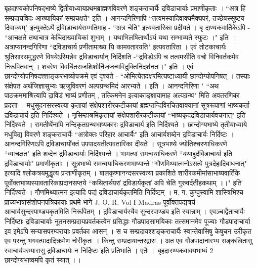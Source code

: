 बृहदाण्यकोपनिषद्भाष्ये द्वितीयाध्यायप्रथमब्राह्मणविवरणे शङ्कराचार्यैः द्रविडाचार्याः प्रमाणीकृताः । ``अत्र हि सम्प्रदायविदः आख्यायिकां सम्प्रचक्षते" इति । आनन्दगिरिणापि ``तत्वमस्यादिवाक्यमैक्यपरं, तच्छेषस्सूष्टय दिवाक्यम्" इत्युक्तेऽर्थे द्रविाडाचार्यसम्मतिमाह - ``अत्र चेति" इत्यवतारिका प्रदीयते । बृ दाण्यकवार्तिकेऽपि - ``आचक्षते तथाचात्र केचिदाख्यायिकां शुभाम् । यथाभिलषितार्थोऽयं यथा सम्भाव्यते स्फुटः ।" इति । अत्राप्यानन्दगिरिणा ``द्रविडाचार्य प्रणीतामाख्य यि कामवतारयति" इत्यवतारिता । एवं तोटकाचार्यः श्रुतिसारसमुद्धरणे विषयेऽस्मिन्नेव द्रविडाचार्यान् निर्दिशति -``द्रविडोऽपि च तत्वमसीति वचो विनिवर्तकमेव निरूपितवान् । शबरेण विवर्धितराजशिशोर्निजजन्मविदुक्तिनिदर्शनतः।" इति । एवं छान्दोग्योपनिषदश्शाङ्करभाष्योपक्रमे एवं दृश्यते - ``ओमित्येतदक्षरमित्यष्टाध्यायी छान्दोग्योपनिषत् । तस्याः संक्षेपत अर्थजिज्ञासुभ्यः ऋजुविवरणं अल्पग्रन्थमिदं आरभ्यते । इति । आनन्दगिरिणा " ``अथ पाठक्रममाश्रित्यापि द्राविडं भाष्यं प्रणीतम् , तत्किमनेन इत्याकाङ्क्षायामाह अल्पग्रन्थ" मिति अवतरणिका प्रदत्ता । मधुसूदनसरस्वत्या कृतायां संक्षेपशारीरकटीकायां ब्रह्मप्तन्दिविरचितवाक्यानां सूत्ररूपाणां भाष्यकर्ता द्रविडाचार्य इति निर्दिश्यते । नृसिम्हाश्रमिकृतायां संक्षेपशारीरकटीकायां ``भाष्यकृदद्रविडाचार्यवचनात्" इति निर्दिश्यते । रामतीर्थेनापि नन्दिकृतग्रन्थभाष्यकारः द्रविडाचार्य इति निर्दिश्यते । छान्दोग्यभाष्ये तृतीयाध्याये मधुविद्य विवरणे शङ्कराचार्यैः ``अत्रोक्तः परिहार आचार्यैः" इति आचार्यशब्देन द्रविडाचार्यः निर्दिष्टः । आनन्दगिरिणाऽपि द्रविडाचार्योक्तं उपपादयतीत्यवतारिका दीयते । सूत्रभाष्ये ज्योतिश्चरणाधिकरणे ``व्याचक्षत" इति शब्देन द्रविडाचार्याः निर्दिश्यन्ते । भामत्यां समन्वयाधिकरणे ``यथाहुर्दविडाचार्या इति द्रविडाचार्याः" प्रमाणीकृताः । सूत्रभाष्ये समन्वयाधिकरणभाष्यान्ते ``गौणमिथ्यात्मनोऽसत्वे पुत्रदेहादिबाधनात्" इत्यादि श्लोकत्रयमुद्धृत्य प्रप्ताणीकृतम् । बालकृष्णानन्दसरस्वत्या प्रकाशिते शारीरकमीमांसाभाष्यवार्तिके पूर्वोक्तभाष्यस्यावतारिकाप्रदानसप्तये ``कथितार्थपरां द्रविडार्यकृतां अपि चेति गुरुवर्दतीहकथाम् ।।" इति निर्दिश्यते । गौणमिथ्यात्मन इत्यादि पद्यं द्रविडाचार्यकृतमिति निर्दिष्टम् । म. ग. कुप्पुस्वामि शास्त्रिभिश्च प्राच्यभाषासंशोघनपत्रिकायाः प्रथमे भागे J. O. R. Vol I Madras पूर्वोक्तपद्यत्रयं आचार्यसुन्दरपाण्ड्यकृतमिति निरूपितम् । द्रविडाचार्यस्यैव सुन्दरपाण्ड्य इति स्यान्नाम् ।
एवञ्चाद्वैताचार्यैः निर्दिष्टाः द्रविडाचार्याः नूतनसम्प्रदायप्रवर्तकत्वेन प्रसिद्धाः गौडपादसामयिकाः तत्समानमेव पूज्याः गौडपादाचार्या इव इमेऽपि सन्यासपरम्परायाः प्रवर्तका आसन् । स च सम्प्रदायश्शङ्कराचार्यैः स्वान्तेवासिषु केषुचन उरीकृत एव परन्तु भगवत्पादादिक्रमेण नोरीकृतः । किन्तु सम्प्रदायान्तरद्वारा । अत एव गौडपादानारभ्य सङ्कलितासु स्वाचार्यपरम्पारासु द्रविडाचार्यः न निर्दिष्टः इति प्रतिभाति । एतैः । बृहदारण्यकवाक्यभाष्यं 2 छान्दोग्यभाष्वमपि कृतं स्यात् ।।
